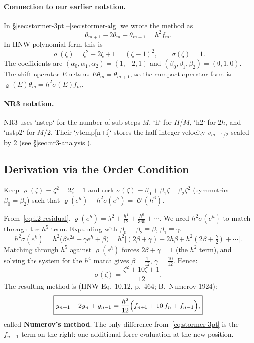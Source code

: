 \documentclass[11pt]{article}
\DeclareMathOperator{\OO}{\mathcal{O}}
\begin{document}
\paragraph{Connection to our earlier notation.}
In \S\ref{sec:stormer-3pt}--\ref{sec:stormer-alg} we wrote the method as
\[
  \theta_{m+1} - 2\theta_m + \theta_{m-1} = h^2 f_m.
\]
In HNW polynomial form this is
\[
  \varrho(\zeta) = \zeta^2 - 2\zeta + 1 = (\zeta-1)^2,
  \qquad
  \sigma(\zeta) = 1.
\]
The coefficients are $(\alpha_0,\alpha_1,\alpha_2) = (1,-2,1)$ and
$(\beta_0,\beta_1,\beta_2) = (0,1,0)$.  The shift operator $E$ acts as
$E\theta_m = \theta_{m+1}$, so the compact operator form is
$\varrho(E)\theta_m = h^2 \sigma(E) f_m$.

\paragraph{NR3 notation.}
NR3 uses `nstep` for the number of sub-steps $M$, `h` for $H/M$, `h2`
for $2h$, and `nstp2` for $M/2$.  Their `ytemp[n+i]` stores the
half-integer velocity $v_{m+1/2}$ scaled by 2 (see
\S\ref{sec:nr3-analysis}).

\subsection{Derivation via the Order Condition}

Keep $\varrho(\zeta) = \zeta^2 - 2\zeta + 1$ and seek $\sigma(\zeta) =
\beta_0 + \beta_1\zeta + \beta_2\zeta^2$ (symmetric: $\beta_0 = \beta_2$) such
that $\varrho(e^h) - h^2\sigma(e^h) = \OO(h^6)$.

From~\eqref{eq:k2-residual}, $\varrho(e^h) = h^2 + \tfrac{h^4}{12} +
\tfrac{h^6}{360} + \cdots$.  We need $h^2\sigma(e^h)$ to match through the
$h^5$ term.  Expanding with $\beta_0 = \beta_2 \equiv \beta$,
$\beta_1 \equiv \gamma$:
\[
  h^2\sigma(e^h)
  = h^2\bigl(\beta e^{2h} + \gamma e^h + \beta\bigr)
  = h^2\bigl[(2\beta + \gamma) + 2h\beta + h^2(2\beta + \tfrac\gamma2) + \cdots\bigr].
\]
Matching through $h^5$ against $\varrho(e^h)$ forces $2\beta + \gamma = 1$
(the $h^2$ term), and solving the system for the $h^4$ match gives
$\beta = \tfrac{1}{12}$, $\gamma = \tfrac{10}{12}$.  Hence:
\begin{equation}
  \label{eq:numerov-sigma}
  \sigma(\zeta) = \frac{\zeta^2 + 10\zeta + 1}{12}.
\end{equation}
The resulting method is (HNW Eq.~10.12, p.~464; B.~Numerov 1924):
\begin{equation}
  \label{eq:numerov}
  \boxed{y_{n+1} - 2y_n + y_{n-1}
  = \frac{h^2}{12}\Bigl(f_{n+1} + 10\,f_n + f_{n-1}\Bigr),}
\end{equation}
called \textbf{Numerov's method}.  The only difference from~\eqref{eq:stormer-3pt}
is the $f_{n+1}$ term on the right: one additional force evaluation at the new
position.
\end{document}
